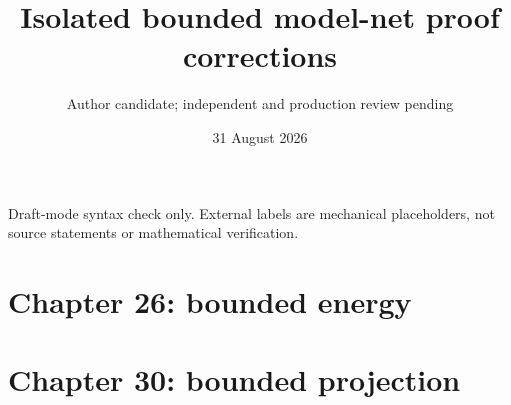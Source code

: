 \documentclass[11pt]{article}
\title{Isolated bounded model-net proof corrections}
\author{Author candidate; independent and production review pending}
\date{31 August 2026}
\begin{document}
\maketitle
\noindent Draft-mode syntax check only. External labels are mechanical
placeholders, not source statements or mathematical verification.

\section*{Chapter 26: bounded energy}

\section*{Chapter 30: bounded projection}

\end{document}
